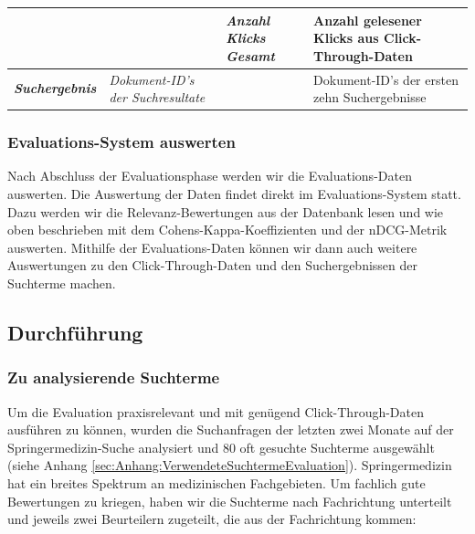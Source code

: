\begin{table}[H]
{\begin{tabular}{llll}
                                                       & \textit{}                                & \textit{Anzahl Klicks Gesamt}            & Anzahl gelesener Klicks aus Click-Through-Daten    \\ \hline
\textit{\textbf{Suchergebnis}}                         & \textit{Dokument-ID's der Suchresultate} & \textit{}                                & Dokument-ID's der ersten zehn Suchergebnisse       \\ \hline
\end{tabular}
}
\vspace{-2em}
\end{table}

\subsubsection{Evaluations-System auswerten}
\label{sec:Evaluation:Aufbau:Vorgehen:Auswerten}

Nach Abschluss der Evaluationsphase werden wir die Evaluations-Daten auswerten. Die Auswertung der Daten findet direkt im Evaluations-System statt. Dazu werden wir die Relevanz-Bewertungen aus der Datenbank lesen und wie oben beschrieben mit dem Cohens-Kappa-Koeffizienten und der nDCG-Metrik auswerten. Mithilfe der Evaluations-Daten können wir dann auch weitere Auswertungen zu den Click-Through-Daten und den Suchergebnissen der Suchterme machen.

\pagebreak

\subsection{Durchführung}
\label{sec:Evaluation:Aufbau:Durchfuehrung}

\subsubsection{Zu analysierende Suchterme}
\label{sec:Evaluation:Aufbau:Durchfuehrung:Aufgabenstellung}

Um die Evaluation praxisrelevant und mit genügend Click-Through-Daten ausführen zu können, wurden die Suchanfragen der letzten zwei Monate auf der Springermedizin-Suche analysiert und 80 oft gesuchte Suchterme ausgewählt (siehe Anhang \ref{sec:Anhang:VerwendeteSuchtermeEvaluation}). Springermedizin hat ein breites Spektrum an medizinischen Fachgebieten. Um fachlich gute Bewertungen zu kriegen, haben wir die Suchterme nach Fachrichtung unterteilt und jeweils zwei Beurteilern zugeteilt, die aus der Fachrichtung kommen:

